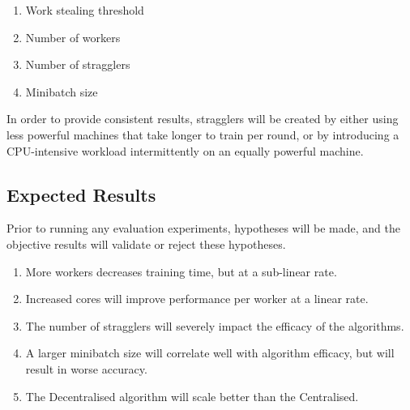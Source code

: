 \documentclass[12pt]{article}
\begin{document}
\begin{enumerate}
\item Work stealing threshold
\item Number of workers
\item Number of stragglers
\item Minibatch size
\end{enumerate}

In order to provide consistent results, stragglers will be created by either using less powerful machines that  take longer to train per round, or by introducing a CPU-intensive workload intermittently on an equally powerful machine.

\subsection{Expected Results}
Prior to running any evaluation experiments, hypotheses will be made, and the objective results will validate or reject these hypotheses.

\begin{enumerate}
\item More workers decreases training time, but at a sub-linear rate.
\item Increased cores will improve performance per worker at a linear rate.
\item The number of stragglers will severely impact the efficacy of the algorithms.
\item A larger minibatch size will correlate well with algorithm efficacy, but will result in worse accuracy.
\item The Decentralised algorithm will scale better than the Centralised.
\end{enumerate}
\end{document}
